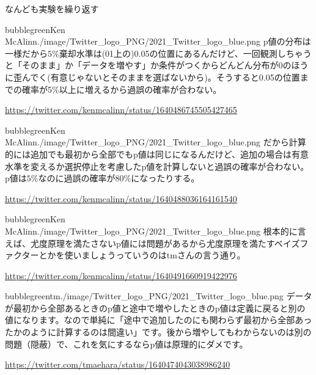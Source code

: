 \begin{SMbox}{なんども実験を繰り返す}
\begin{rightbubbles}{bubblegreen}{Ken McAlinn}{./image/Twitter_logo_PNG/2021_Twitter_logo_blue.png}
  p値の分布は一様だから$5\%$棄却水準は(01上の)0.05の位置にあるんだけど、一回観測しちゃうと「そのまま」か「データを増やす」か条件がつくからどんどん分布が0のほうに歪んでく(有意じゃないとそのままを選ばないから)。そうすると0.05の位置までの確率が5$\%$以上に増えるから過誤の確率が合わない。
\begin{flushright} 
\small	\url{https://twitter.com/kenmcalinn/status/1640486745505427465}
\end{flushright}    
\end{rightbubbles}


\begin{rightbubbles}{bubblegreen}{Ken McAlinn}{./image/Twitter_logo_PNG/2021_Twitter_logo_blue.png}
  だから計算的には追加でも最初から全部でもp値は同じになるんだけど、追加の場合は有意水準を変えるか選択停止を考慮したp値を計算しないと過誤の確率が合わない。p値は$5\%$なのに過誤の確率が$80\%$になったりする。
\begin{flushright} 
\small	\url{https://twitter.com/kenmcalinn/status/1640488036164161540}
\end{flushright}    
\end{rightbubbles}

\begin{rightbubbles}{bubblegreen}{Ken McAlinn}{./image/Twitter_logo_PNG/2021_Twitter_logo_blue.png}
  根本的に言えば、尤度原理を満たさないp値には問題があるから尤度原理を満たすベイズファクターとかを使いましょうっていうのはtmさんの言う通り。
\begin{flushright} 
\small	\url{https://twitter.com/kenmcalinn/status/1640491660919422976}
\end{flushright}    
\end{rightbubbles}

\begin{rightbubbles}{bubblegreen}{tm}{./image/Twitter_logo_PNG/2021_Twitter_logo_blue.png}
  データが最初から全部あるときのp値と途中で増やしたときのp値は定義に戻ると別の値になります。なので単純に「途中で追加したのにも関わらず最初から全部あったかのように計算するのは間違い」です。後から増やしてもわからないのは別の問題（隠蔽）で、これを気にするならp値は原理的にダメです。
\begin{flushright} 
\small	\url{https://twitter.com/tmaehara/status/1640474043038986240}
\end{flushright}    
\end{rightbubbles}



\end{SMbox}
